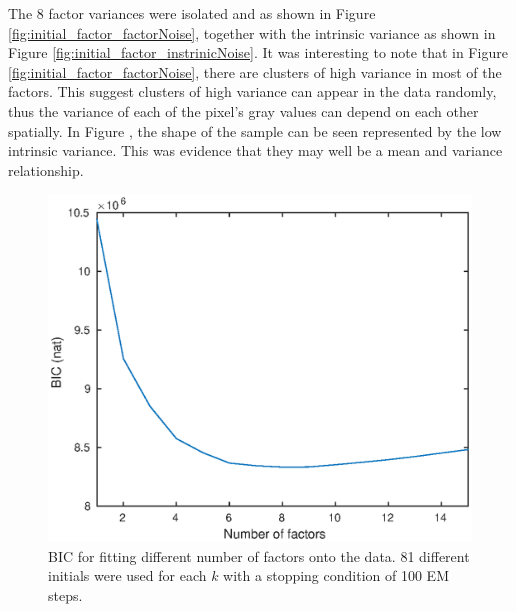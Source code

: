 \documentclass[12pt]{report}
\begin{document}
The 8 factor variances were isolated and as shown in Figure \ref{fig:initial_factor_factorNoise}, together with the intrinsic variance as shown in Figure \ref{fig:initial_factor_instrinicNoise}. It was interesting to note that in Figure \ref{fig:initial_factor_factorNoise}, there are clusters of high variance in most of the factors. This suggest clusters of high variance can appear in the data randomly, thus the variance of each of the pixel's gray values can depend on each other spatially. In Figure \label{fig:initial_factor_instrinicNoise}, the shape of the sample can be seen represented by the low intrinsic variance. This was evidence that they may well be a mean and variance relationship.

\begin{figure}
	\centering
	\includegraphics[width=\textwidth]{figures/initial_factor_BIC.eps}
	\caption{BIC for fitting different number of factors onto the data. 81 different initials were used for each $k$ with a stopping condition of 100 EM steps.}
	\label{fig:initial_factor_BIC}
\end{figure}
\end{document}
